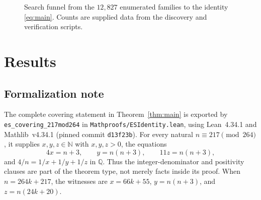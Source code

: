 \documentclass[11pt,a4paper]{article}
\theoremstyle{definition}
\begin{document}
\begin{figure}[t]
  \centering
  \caption{Search funnel from the $12{,}827$ enumerated families to the
    identity \eqref{eq:main}. Counts are supplied data from the discovery
    and verification scripts.}
  \label{fig:funnel}
\end{figure}

\section{Results}

\subsection{Formalization note}

The complete covering statement in Theorem~\ref{thm:main} is exported
by \texttt{es\_covering\_217mod264} in
\texttt{Mathproofs/ESIdentity.lean}, using Lean~4.34.1 and
Mathlib~v4.34.1 (pinned commit \texttt{d13f23b}). For every natural
$n\equiv217\pmod{264}$, it supplies $x,y,z\in\mathbb{N}$ with
$x,y,z>0$, the equations
\[
4x=n+3,\qquad y=n(n+3),\qquad 11z=n(n+3),
\]
and $4/n=1/x+1/y+1/z$ in $\mathbb{Q}$. Thus the integer-denominator
and positivity clauses are part of the theorem type, not merely facts
inside its proof. When $n=264k+217$, the witnesses are
$x=66k+55$, $y=n(n+3)$, and $z=n(24k+20)$.
\end{document}
